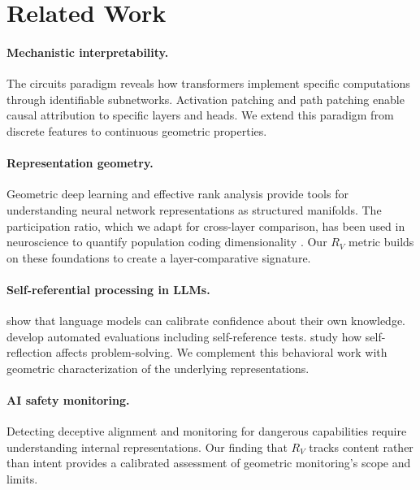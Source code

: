\documentclass{article}
\newcommand{\RV}{R_V}
\begin{document}
\section{Related Work}

\paragraph{Mechanistic interpretability.}
The circuits paradigm \citep{elhage2021mathematical, olsson2022context} reveals how transformers implement specific computations through identifiable subnetworks.
Activation patching \citep{meng2022locating} and path patching \citep{goldowsky2023localizing} enable causal attribution to specific layers and heads.
We extend this paradigm from discrete features to continuous geometric properties.

\paragraph{Representation geometry.}
Geometric deep learning \citep{bronstein2021geometric} and effective rank analysis \citep{roy2007effective} provide tools for understanding neural network representations as structured manifolds.
The participation ratio, which we adapt for cross-layer comparison, has been used in neuroscience to quantify population coding dimensionality \citep{gao2017theory}.
Our $\RV$ metric builds on these foundations to create a layer-comparative signature.

\paragraph{Self-referential processing in LLMs.}
\citet{kadavath2022language} show that language models can calibrate confidence about their own knowledge.
\citet{perez2022discovering} develop automated evaluations including self-reference tests.
\citet{chen2024self} study how self-reflection affects problem-solving.
We complement this behavioral work with geometric characterization of the underlying representations.

\paragraph{AI safety monitoring.}
Detecting deceptive alignment \citep{hubinger2019risks} and monitoring for dangerous capabilities \citep{ngo2022alignment} require understanding internal representations.
Our finding that $\RV$ tracks content rather than intent provides a calibrated assessment of geometric monitoring's scope and limits.
\end{document}
